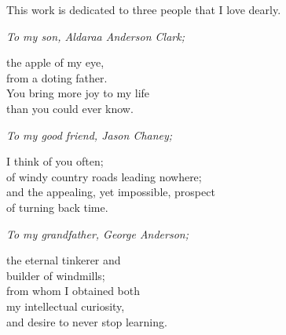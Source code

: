 \begin{dedication} 


This work is dedicated to three people that I love dearly.

{\raggedright
{\addtolength{\leftskip}{40mm} 
\vspace{12pt}
\emph{To my son, Aldaraa Anderson Clark;}

{\addtolength{\leftskip}{5mm} 
the apple of my eye,\\
from a doting father.\\
You bring more joy to my life\\
than you could ever know.\\
\par}

\vspace{12pt}
\emph{To my good friend, Jason Chaney; }

{\addtolength{\leftskip}{5mm} 
I think of you often;\\
of windy country roads leading nowhere;\\
and the appealing, yet impossible, prospect\\ 
of turning back time.\\
\par}
\vspace{12pt}
\emph{To my grandfather, George Anderson;}

{\addtolength{\leftskip}{5mm} 
the eternal tinkerer and\\
builder of windmills;\\
from whom I obtained both\\
my intellectual curiosity,\\
and desire to never stop learning.\\
\par}

}
}
\end{dedication}

